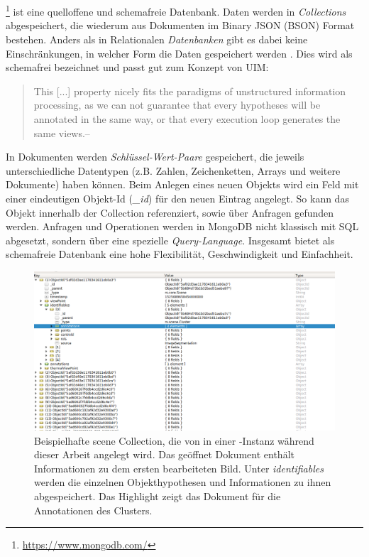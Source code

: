\section{\mongodb}
\label{sec:mongodb}
\mongodb\footnote{\url{https://www.mongodb.com/}} ist eine quelloffene und schemafreie Datenbank. Daten werden in \textit{Collections} abgespeichert, die wiederum aus Dokumenten im Binary JSON (BSON) Format bestehen. Anders als in Relationalen \textit{Datenbanken} gibt es dabei keine Einschränkungen, in welcher Form die Daten gespeichert werden \cite{mongoVsOracle}. Dies wird als schemafrei bezeichnet und passt gut zum Konzept von UIM:
\begin{quote}
\glqq This [...] property nicely fits the paradigms of unstructured information processing, as we can not guarantee that every hypotheses will be annotated in the same way, or that every execution loop generates the same views.\grqq \hfill -- \cite{episodicMemory}
\end{quote}
In Dokumenten werden \textit{Schlüssel-Wert-Paare} gespeichert, die jeweils unterschiedliche Datentypen (z.B. Zahlen, Zeichenketten, Arrays und weitere Dokumente) haben können. Beim Anlegen eines neuen Objekts wird ein Feld mit einer eindeutigen Objekt-Id (\textit{\_id}) für den neuen Eintrag angelegt. So kann das Objekt innerhalb der Collection referenziert, sowie über Anfragen gefunden werden. Anfragen und Operationen werden in MongoDB nicht klassisch mit SQL abgesetzt, sondern über eine spezielle \textit{Query-Language}. Insgesamt bietet \mongodb als schemafreie Datenbank eine hohe Flexibilität, Geschwindigkeit und Einfachheit. \cite{mongoVsOracle} \par

\begin{figure}
\centering
\includegraphics[width=\textwidth]{img/chapter3/mongoPic.png}
\caption[Die scene Collection einer \mongodb-Instanz]{Beispielhafte scene Collection, die von \robosherlock in einer \mongodb-Instanz während dieser Arbeit angelegt wird. Das geöffnet Dokument enthält Informationen zu dem ersten bearbeiteten Bild. Unter \textit{identifiables} werden die einzelnen Objekthypothesen und Informationen zu ihnen abgespeichert. Das Highlight zeigt das Dokument für die Annotationen des Clusters.}
\end{figure}

